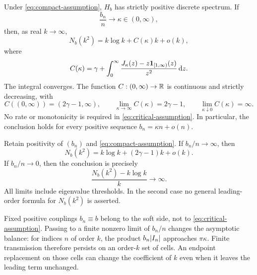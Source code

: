 \begin{theorem}
\label{thm:critical}
Under \eqref{eq:compact-assumption}, $H_b$ has strictly positive
discrete spectrum. If
\begin{equation}
 \frac{b_n}{n}\longrightarrow\kappa\in(0,\infty),
 \label{eq:critical-assumption}
\end{equation}
then, as real $k\to\infty$,
\begin{equation}
 N_b(k^2)=k\log k+C(\kappa)k+o(k),
 \label{eq:main-law}
\end{equation}
where
\begin{equation}
 C(\kappa)=\gamma+
     \int_0^\infty
       \frac{J_\kappa(z)-z\mathbf 1_{[1,\infty)}(z)}{z^2}\,\mathrm d z.
 \label{eq:coefficient-definition}
\end{equation}
The integral converges. The function $C:(0,\infty)\to\mathbb R$ is
continuous and strictly decreasing, with
\begin{equation}
 C((0,\infty))=(2\gamma-1,\infty),\qquad
 \lim_{\kappa\to\infty}C(\kappa)=2\gamma-1,
 \qquad \lim_{\kappa\downarrow0}C(\kappa)=\infty.
 \label{eq:coefficient-range}
\end{equation}
No rate or monotonicity is required in \eqref{eq:critical-assumption}.
In particular, the conclusion holds for every positive sequence
$b_n=\kappa n+o(n)$.
\end{theorem}

\begin{theorem}
\label{thm:endpoint}
Retain positivity of $(b_n)$ and \eqref{eq:compact-assumption}.
If $b_n/n\to\infty$, then
\begin{equation}
 N_b(k^2)=k\log k+(2\gamma-1)k+o(k).
 \label{eq:hard-law}
\end{equation}
If $b_n/n\to0$, then the conclusion is precisely
\begin{equation}
 \frac{N_b(k^2)-k\log k}{k}\longrightarrow\infty.
 \label{eq:soft-law}
\end{equation}
All limits include eigenvalue thresholds. In the second case no
general leading-order formula for $N_b(k^2)$ is asserted.
\end{theorem}

Fixed positive couplings $b_n\equiv b$ belong to the soft side,
not to \eqref{eq:critical-assumption}. Passing to a finite nonzero
limit of $b_n/n$ changes the asymptotic balance: for indices $n$ of
order $k$, the product $b_n\lvert I_n\rvert$ approaches $\pi\kappa$.
Finite transmission therefore persists on an order-$k$ set of cells.
An endpoint replacement on those cells can change the coefficient
of $k$ even when it leaves the leading term unchanged.

